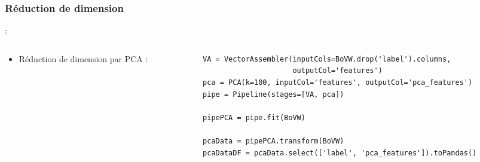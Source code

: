 \documentclass[8pt,aspectratio=169,hyperref={unicode=true}]{beamer}
\begin{document}
\subsubsection{Réduction de dimension}
\begin{frame}[fragile]{\insertsubsection : \insertsubsubsection}
  \begin{columns}
    \begin{column}{.25\textwidth}
      \begin{itemize}
        \item Réduction de dimension par PCA :
      \end{itemize}
    \end{column}
    \begin{column}{.75\textwidth}
      \begin{verbatim}
VA = VectorAssembler(inputCols=BoVW.drop('label').columns,
                     outputCol='features')
pca = PCA(k=100, inputCol='features', outputCol='pca_features')
pipe = Pipeline(stages=[VA, pca])

pipePCA = pipe.fit(BoVW)

pcaData = pipePCA.transform(BoVW)
pcaDataDF = pcaData.select(['label', 'pca_features']).toPandas()
      \end{verbatim}
    \end{column}
  \end{columns}
\end{frame}
\end{document}
